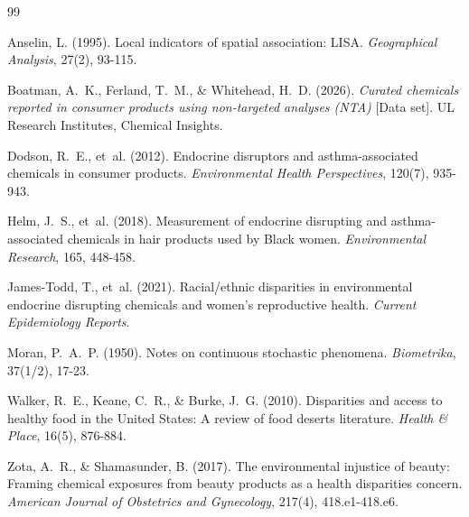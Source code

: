 \documentclass[12pt,letterpaper]{article}
\begin{document}

\begin{thebibliography}{99}

 Anselin, L. (1995). Local indicators of
spatial association: LISA. \textit{Geographical Analysis}, 27(2), 93-115.

 Boatman, A.~K., Ferland, T.~M., \&
Whitehead, H.~D. (2026). \textit{Curated chemicals reported in consumer products
using non-targeted analyses (NTA)} [Data set]. UL Research Institutes, Chemical
Insights.

 Dodson, R.~E., et~al. (2012). Endocrine
disruptors and asthma-associated chemicals in consumer products.
\textit{Environmental Health Perspectives}, 120(7), 935-943.

 Helm, J.~S., et~al. (2018). Measurement of
endocrine disrupting and asthma-associated chemicals in hair products used by
Black women. \textit{Environmental Research}, 165, 448-458.

 James-Todd, T., et~al. (2021).
Racial/ethnic disparities in environmental endocrine disrupting chemicals and
women's reproductive health. \textit{Current Epidemiology Reports}.

 Moran, P.~A.~P. (1950). Notes on continuous
stochastic phenomena. \textit{Biometrika}, 37(1/2), 17-23.

 Walker, R.~E., Keane, C.~R., \&
Burke, J.~G. (2010). Disparities and access to healthy food in the United States:
A review of food deserts literature. \textit{Health \& Place}, 16(5), 876-884.

 Zota, A.~R., \& Shamasunder, B.
(2017). The environmental injustice of beauty: Framing chemical exposures from
beauty products as a health disparities concern. \textit{American Journal of
Obstetrics and Gynecology}, 217(4), 418.e1-418.e6.

\end{thebibliography}
\end{document}
